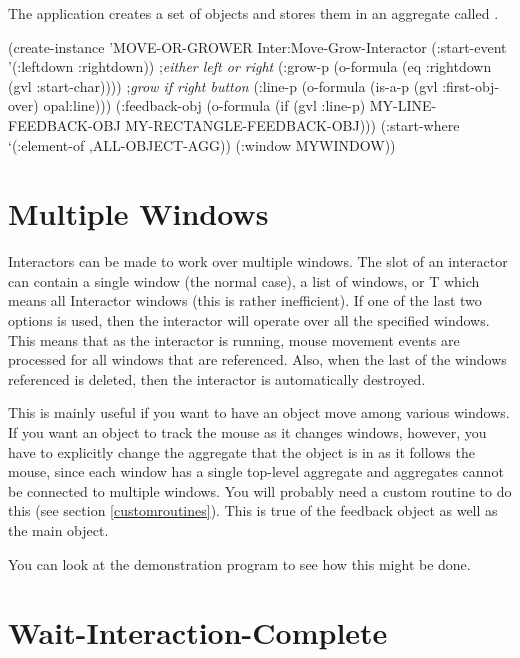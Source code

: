 The application creates a set of objects and stores them in an
aggregate called .

\label{movegrowexample2}
\begin{programexample}
(create-instance 'MOVE-OR-GROWER Inter:Move-Grow-Interactor
   (:start-event '(:leftdown :rightdown))  ;{\it either left or right}
   (:grow-p (o-formula (eq :rightdown (gvl :start-char)))) ;{\it grow if right button}
   (:line-p (o-formula (is-a-p (gvl :first-obj-over) opal:line)))
   (:feedback-obj (o-formula
		   (if (gvl :line-p)
		       MY-LINE-FEEDBACK-OBJ
		       MY-RECTANGLE-FEEDBACK-OBJ)))
   (:start-where `(:element-of ,ALL-OBJECT-AGG))
   (:window MYWINDOW))
\end{programexample}

\section{Multiple Windows}
\label{multiwindow}
Interactors can be made to work over multiple windows.  The 
slot of an interactor can contain a single window (the normal case), a list
of windows, or T which means all Interactor windows (this is rather
inefficient).  If one of the last
two options is used, then the interactor will operate over all the
specified windows.   This means that as the interactor is running, mouse
movement events are processed for all windows that are referenced.  Also,
when the last of the windows referenced is deleted, then the interactor is
automatically destroyed.

This is mainly useful if you want to have an object move among various
windows.  If you want an object to track the mouse as it changes windows,
however, you have to explicitly change the aggregate that the object is in
as it follows the mouse, since each window has a single top-level aggregate
and aggregates cannot be connected to multiple windows.  You will probably
need a custom  routine to do this (see section
\ref{customroutines}).  This is true of the feedback object as well as the
main object.

You can look at the demonstration program
 to see how this might be done.


\section{Wait-Interaction-Complete}
\label{w-i-c}

